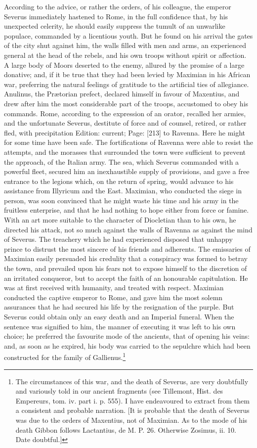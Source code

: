 According to the advice, or rather the orders, of his colleague, the emperor Severus immediately hastened to Rome, in the full confidence that, by his unexpected celerity, he should easily suppress the tumult of an unwarlike populace, commanded by a licentious youth. But he found on his arrival the gates of the city shut against him, the walls filled with men and arms, an experienced general at the head of the rebels, and his own troops without spirit or affection. A large body of Moors deserted to the enemy, allured by the promise of a large donative; and, if it be true that they had been levied by Maximian in his African war, preferring the natural feelings of gratitude to the artificial ties of allegiance. Anulinus, the Prætorian prefect, declared himself in favour of Maxentius, and drew after him the most considerable part of the troops, accustomed to obey his commands. Rome, according to the expression of an orator, recalled her armies, and the unfortunate Severus, destitute of force and of counsel, retired, or rather fled, with precipitation Edition: current; Page: [213] to Ravenna. Here he might for some time have been safe. The fortifications of Ravenna were able to resist the attempts, and the morasses that surrounded the town were sufficient to prevent the approach, of the Italian army. The sea, which Severus commanded with a powerful fleet, secured him an inexhaustible supply of provisions, and gave a free entrance to the legions which, on the return of spring, would advance to his assistance from Illyricum and the East. Maximian, who conducted the siege in person, was soon convinced that he might waste his time and his army in the fruitless enterprise, and that he had nothing to hope either from force or famine. With an art more suitable to the character of Diocletian than to his own, he directed his attack, not so much against the walls of Ravenna as against the mind of Severus. The treachery which he had experienced disposed that unhappy prince to distrust the most sincere of his friends and adherents. The emissaries of Maximian easily persuaded his credulity that a conspiracy was formed to betray the town, and prevailed upon his fears not to expose himself to the discretion of an irritated conqueror, but to accept the faith of an honourable capitulation. He was at first received with humanity, and treated with respect. Maximian conducted the captive emperor to Rome, and gave him the most solemn assurances that he had secured his life by the resignation of the purple. But Severus could obtain only an easy death and an Imperial funeral. When the sentence was signified to him, the manner of executing it was left to his own choice; he preferred the favourite mode of the ancients, that of opening his veins: and, as soon as he expired, his body was carried to the sepulchre which had been constructed for the family of Gallienus.\footnote{The circumstances of this war, and the death of Severus, are very doubtfully and variously told in our ancient fragments (see Tillemont, Hist. des Empereurs, tom. iv. part i. p. 555). I have endeavoured to extract from them a consistent and probable narration. [It is probable that the death of Severus was due to the orders of Maxentius, not of Maximian. As to the mode of his death Gibbon follows Lactantius, de M. P. 26. Otherwise Zosimus, ii. 10. Date doubtful.]}
